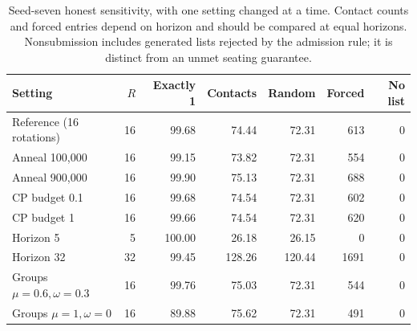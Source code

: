 \begin{table}[tb]\centering\small
\caption{Seed-seven honest sensitivity, with one setting changed at a time. Contact counts and forced entries depend on horizon and should be compared at equal horizons. Nonsubmission includes generated lists rejected by the admission rule; it is distinct from an unmet seating guarantee.}\label{tab:sensitivity}
\begin{tabular}{@{}lrrrrrr@{}}\toprule
Setting & $R$ & Exactly 1 & Contacts & Random & Forced & No list \\ \midrule
Reference (16 rotations) & 16 & 99.68 & 74.44 & 72.31 & 613 & 0 \\
Anneal 100,000 & 16 & 99.15 & 73.82 & 72.31 & 554 & 0 \\
Anneal 900,000 & 16 & 99.90 & 75.13 & 72.31 & 688 & 0 \\
CP budget 0.1 & 16 & 99.68 & 74.54 & 72.31 & 602 & 0 \\
CP budget 1 & 16 & 99.66 & 74.54 & 72.31 & 620 & 0 \\
Horizon 5 & 5 & 100.00 & 26.18 & 26.15 & 0 & 0 \\
Horizon 32 & 32 & 99.45 & 128.26 & 120.44 & 1691 & 0 \\
Groups $\mu=0.6,\omega=0.3$ & 16 & 99.76 & 75.03 & 72.31 & 544 & 0 \\
Groups $\mu=1,\omega=0$ & 16 & 89.88 & 75.62 & 72.31 & 491 & 0 \\
\bottomrule\end{tabular}\end{table}
